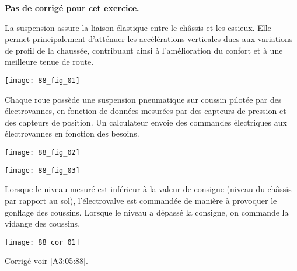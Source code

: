 \normaltrue \difficilefalse \tdifficilefalse
\correctionfalse

\setcounter{numques}{0}
\ifcorrection
\else
\textbf{Pas de corrigé pour cet exercice.}
\fi



\ifprof
\else
La suspension assure la liaison élastique entre le châssis et les essieux. Elle permet principalement d’atténuer les accélérations verticales dues aux variations de profil de la chaussée, contribuant ainsi à l’amélioration du confort et à une meilleure tenue de route.

\begin{center}
\texttt{[image: 88\_fig\_01]}
\end{center}

Chaque roue possède une suspension pneumatique sur coussin pilotée par des électrovannes, en fonction de données mesurées par des capteurs de pression et des capteurs de position. Un calculateur envoie des commandes électriques aux électrovannes en fonction des besoins.

\begin{center}
\texttt{[image: 88\_fig\_02]}
\end{center}


\begin{center}
\texttt{[image: 88\_fig\_03]}
\end{center}

Lorsque le niveau mesuré est inférieur à la valeur de consigne (niveau du châssis par rapport au sol), l’électrovalve est commandée de manière à provoquer le gonflage des coussins.
Lorsque le niveau a dépassé la consigne, on commande la vidange des coussins.

\fi
{}
\ifprof
\begin{corrige}
\begin{center}
\texttt{[image: 88\_cor\_01]}
\end{center}
\end{corrige}
\else
\fi







\ifprof
\else
\begin{flushright}
\footnotesize{Corrigé  voir \ref{A3:05:88}.}
\end{flushright}%
\fi
